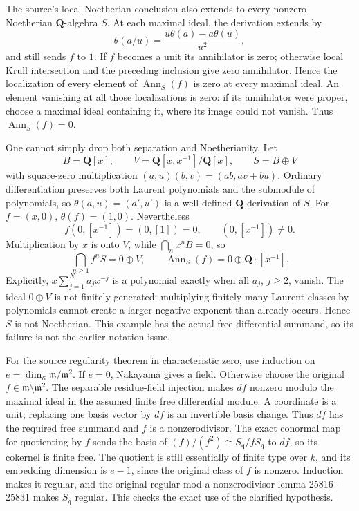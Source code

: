 The source's local Noetherian conclusion also extends to every nonzero Noetherian \(\mathbf Q\)-algebra \(S\). At each maximal ideal, the derivation extends by \[
\theta(a/u)=\frac{u\theta(a)-a\theta(u)}{u^2},
\] and still sends \(f\) to \(1\). If \(f\) becomes a unit its annihilator is zero; otherwise local Krull intersection and the preceding inclusion give zero annihilator. Hence the localization of every element of \(\operatorname{Ann}_S(f)\) is zero at every maximal ideal. An element vanishing at all those localizations is zero: if its annihilator were proper, choose a maximal ideal containing it, where its image could not vanish. Thus \(\operatorname{Ann}_S(f)=0\).

One cannot simply drop both separation and Noetherianity. Let \[
B=\mathbf Q[x],\qquad
V=\mathbf Q[x,x^{-1}]/\mathbf Q[x],\qquad
S=B\oplus V
\] with square-zero multiplication \((a,u)(b,v)=(ab,av+bu)\). Ordinary differentiation preserves both Laurent polynomials and the submodule of polynomials, so \(\theta(a,u)=(a',u')\) is a well-defined \(\mathbf Q\)-derivation of \(S\). For \(f=(x,0)\), \(\theta(f)=(1,0)\). Nevertheless \[
f(0,[x^{-1}])=(0,[1])=0,\qquad (0,[x^{-1}])\ne0.
\] Multiplication by \(x\) is onto \(V\), while \(\bigcap_nx^nB=0\), so \[
\bigcap_{n\ge1}f^nS=0\oplus V,\qquad
\operatorname{Ann}_S(f)=0\oplus\mathbf Q\cdot[x^{-1}].
\] Explicitly, \(x\sum_{j=1}^N a_jx^{-j}\) is a polynomial exactly when all \(a_j\), \(j\ge2\), vanish. The ideal \(0\oplus V\) is not finitely generated: multiplying finitely many Laurent classes by polynomials cannot create a larger negative exponent than already occurs. Hence \(S\) is not Noetherian. This example has the actual free differential summand, so its failure is not the earlier notation issue.

For the source regularity theorem in characteristic zero, use induction on \(e=\dim_\kappa\mathfrak m/\mathfrak m^2\). If \(e=0\), Nakayama gives a field. Otherwise choose the original \(f\in\mathfrak m\setminus\mathfrak m^2\). The separable residue-field injection makes \(df\) nonzero modulo the maximal ideal in the assumed finite free differential module. A coordinate is a unit; replacing one basis vector by \(df\) is an invertible basis change. Thus \(df\) has the required free summand and \(f\) is a nonzerodivisor. The exact conormal map for quotienting by \(f\) sends the basis of \((f)/(f^2)\cong S_{\mathfrak q}/fS_{\mathfrak q}\) to \(df\), so its cokernel is finite free. The quotient is still essentially of finite type over \(k\), and its embedding dimension is \(e-1\), since the original class of \(f\) is nonzero. Induction makes it regular, and the original regular-mod-a-nonzerodivisor lemma 25816--25831 makes \(S_{\mathfrak q}\) regular. This checks the exact use of the clarified hypothesis.

